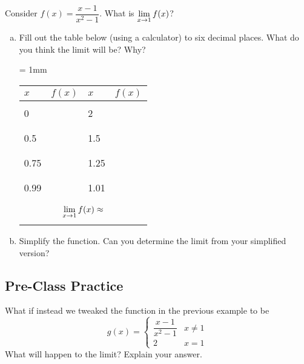 \documentclass[notes]{subfiles}
\begin{document}
		\begin{ex}
			Consider \(f(x) = \dfrac{x-1}{x^2-1}\).  What is \(\displaystyle \lim_{x\to 1} f(x)\)?
			\begin{enumerate}[(a)]
				\item Fill out the table below (using a calculator) to six decimal places.  What do you think the limit will be?  Why?\\
					\begin{center}
						\tabulinesep = 1mm
						\begin{tabu}to .9\textwidth{|X[c]|X[3,c] || X[c] | X[3,c]|}\hline
							\(x\)		&	\(f(x)\)		& \(x\)		& \(f(x)\)\\ \hline
									& 				&			& \\
							0		& 				& 2			& \\
									&				& 			& \\ \hline
									& 				&			& \\
							0.5		& 				& 1.5		& \\
									&				& 			& \\ \hline
									& 				&			& \\
							0.75	& 				& 1.25		& \\
									&				& 			& \\ \hline
									& 				&			& \\
							0.99	& 				& 1.01		& \\
									&				& 			& \\ \hline				
									\\						
								 \\ 
									\\ \hline				
						\end{tabu}
					\end{center}
						
				\item Simplify the function.  Can you determine the limit from your simplified version?
			\end{enumerate}
		\end{ex}
			\newpage
			
	\subsection*{Pre-Class Practice}
		\begin{ex}
			What if instead we tweaked the function in the previous example to be 
				\[g(x) = \begin{cases}\dfrac{x-1}{x^2-1} & x\neq 1\\[5pt] 2 & x = 1 \end{cases}\]
			 What will happen to the limit?  Explain your answer.
		\end{ex}
			
\end{document}
